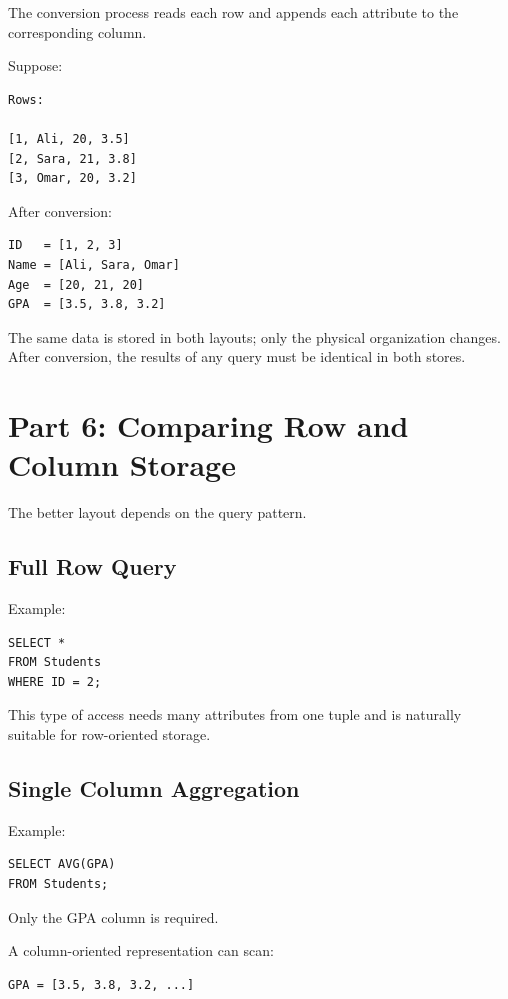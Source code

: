 \documentclass[12pt,a4paper]{article}
\begin{document}
The conversion process reads each row and appends each attribute to the corresponding column.

Suppose:

\begin{verbatim}
Rows:

[1, Ali, 20, 3.5]
[2, Sara, 21, 3.8]
[3, Omar, 20, 3.2]
\end{verbatim}

After conversion:

\begin{verbatim}
ID   = [1, 2, 3]
Name = [Ali, Sara, Omar]
Age  = [20, 21, 20]
GPA  = [3.5, 3.8, 3.2]
\end{verbatim}

The same data is stored in both layouts; only the physical organization changes. After conversion, the results of any query must be identical in both stores.

\section{Part 6: Comparing Row and Column Storage}

The better layout depends on the query pattern.

\subsection{Full Row Query}

Example:

\begin{verbatim}
SELECT *
FROM Students
WHERE ID = 2;
\end{verbatim}

This type of access needs many attributes from one tuple and is naturally suitable for row-oriented storage.

\subsection{Single Column Aggregation}

Example:

\begin{verbatim}
SELECT AVG(GPA)
FROM Students;
\end{verbatim}

Only the GPA column is required.

A column-oriented representation can scan:

\begin{verbatim}
GPA = [3.5, 3.8, 3.2, ...]
\end{verbatim}
\end{document}

